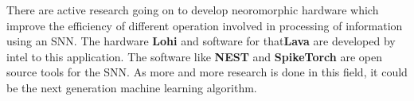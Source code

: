 There are active research going on to develop neoromorphic hardware which
improve the efficiency of different operation involved in processing of
information using an SNN. The hardware \textbf{Lohi} and software for
that\textbf{Lava} are developed by intel to this application. The software like
\textbf{NEST} and \textbf{SpikeTorch} are open source tools for the SNN. As
more and more research is done in this field, it could be the next generation
machine learning algorithm.
